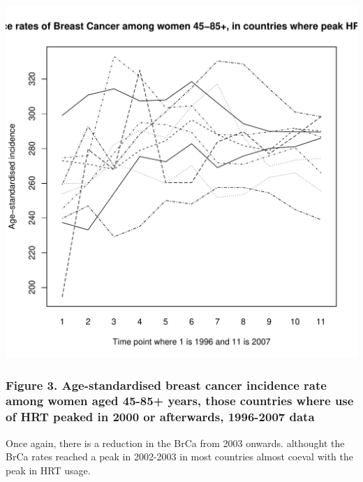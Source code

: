 \documentclass{article}\usepackage[]{graphicx}\usepackage[]{color}
\makeatletter
\def\maxwidth{ %
  \ifdim\Gin@nat@width>\linewidth
    \linewidth
  \else
    \Gin@nat@width
  \fi
}
\newenvironment{knitrout}{}{} %
\makeatother
\begin{document}
\begin{knitrout}
\color{fgcolor}
\includegraphics[width=\maxwidth]{figure/peakhrtusepost2k-1} 

\end{knitrout}

\subsubsection*{Figure 3. Age-standardised breast cancer incidence rate among women aged 45-85+ years, those countries where use of HRT peaked in 2000 or afterwards, 1996-2007 data}


Once again, there is a reduction in the BrCa from 2003 onwards. althought the BrCa rates reached a peak in 2002-2003 in most countries almost coeval with the peak in HRT usage.
\end{document}
